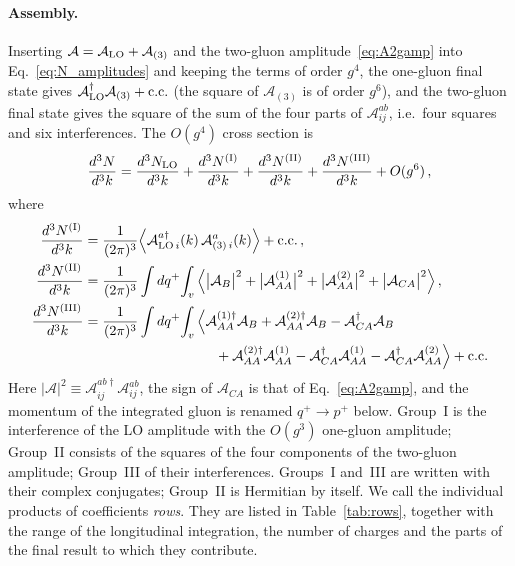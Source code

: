 \paragraph{Assembly.} Inserting $\mathcal A=\mathcal A_{\rm LO}+\mathcal A_{(3)}$ and the two-gluon amplitude~\eqref{eq:A2gamp} into Eq.~\eqref{eq:N_amplitudes} and keeping the terms of order $g^4$, the one-gluon final state gives $\mathcal A_{\rm LO}^\dagger\mathcal A_{(3)}+{\rm c.c.}$ (the square of $\mathcal A_{(3)}$ is of order $g^6$), and the two-gluon final state gives the square of the sum of the four parts of $\mathcal A^{ab}_{ij}$, i.e.\ four squares and six interferences. The $O(g^4)$ cross section is
\begin{align}\label{eq:NLOdecomp}
\frac{d^3N}{d^3k}=\frac{d^3N_{\rm LO}}{d^3k}+\frac{d^3N^{\rm(I)}}{d^3k}+\frac{d^3N^{\rm(II)}}{d^3k}+\frac{d^3N^{\rm(III)}}{d^3k}+O(g^6)\,,
\end{align}
where
\begin{align}\label{eq:Groups}
\frac{d^3N^{\rm(I)}}{d^3k}&=\frac{1}{(2\pi)^3}\Big\langle\mathcal A^{a\dagger}_{{\rm LO}\,i}(k)\,\mathcal A^a_{(3)\,i}(k)\Big\rangle+{\rm c.c.}\,,\notag\\
\frac{d^3N^{\rm(II)}}{d^3k}&=\frac{1}{(2\pi)^3}\int dq^+\!\int_v\Big\langle\big|\mathcal A_B\big|^2+\big|\mathcal A^{(1)}_{AA}\big|^2+\big|\mathcal A^{(2)}_{AA}\big|^2+\big|\mathcal A_{CA}\big|^2\Big\rangle\,,\notag\\
\frac{d^3N^{\rm(III)}}{d^3k}&=\frac{1}{(2\pi)^3}\int dq^+\!\int_v\Big\langle\mathcal A^{(1)\dagger}_{AA}\mathcal A_B+\mathcal A^{(2)\dagger}_{AA}\mathcal A_B-\mathcal A^{\dagger}_{CA}\mathcal A_B
\notag\\&\hspace{3.3cm}+\mathcal A^{(2)\dagger}_{AA}\mathcal A^{(1)}_{AA}-\mathcal A^{\dagger}_{CA}\mathcal A^{(1)}_{AA}-\mathcal A^{\dagger}_{CA}\mathcal A^{(2)}_{AA}\Big\rangle+{\rm c.c.}
\end{align}
Here $|\mathcal A|^2\equiv\mathcal A^{ab\dagger}_{ij}\mathcal A^{ab}_{ij}$, the sign of $\mathcal A_{CA}$ is that of Eq.~\eqref{eq:A2gamp}, and the momentum of the integrated gluon is renamed $q^+\to p^+$ below. Group~I is the interference of the LO amplitude with the $O(g^3)$ one-gluon amplitude; Group~II consists of the squares of the four components of the two-gluon amplitude; Group~III of their interferences. Groups~I and~III are written with their complex conjugates; Group~II is Hermitian by itself. We call the individual products of coefficients \emph{rows}. They are listed in Table~\ref{tab:rows}, together with the range of the longitudinal integration, the number of charges and the parts of the final result to which they contribute.

